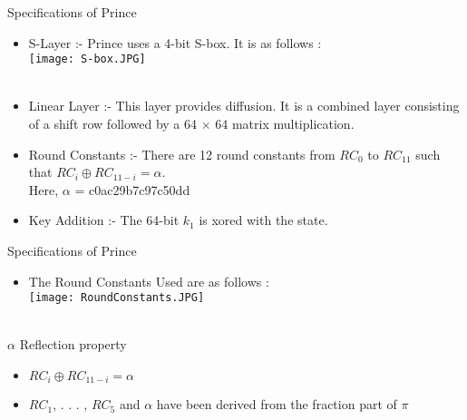 \begin{frame}{Specifications of Prince}
\begin{itemize}
    
    \item S-Layer :- Prince uses a 4-bit S-box. It is as follows : \\
     \texttt{[image: S-box.JPG]} \\ \\
     \item Linear Layer :- This layer provides diffusion. It is a combined layer consisting of a shift row followed by a 64 $\times$ 64 matrix multiplication.
     \item Round Constants :- There are 12 round constants from $RC_0$ to $RC_{11}$ such that $RC_i \oplus RC_{11-i} = \alpha$. \\
     Here, $\alpha$ = c0ac29b7c97c50dd \\
     \item Key Addition :- The 64-bit $k_1$ is xored with the state. 
\end{itemize}
\end{frame}

\begin{frame}{Specifications of Prince}
\begin{itemize}
    
   \item The Round Constants Used are as follows : \\
   \texttt{[image: RoundConstants.JPG]} \\ \\
\end{itemize}
\begin{block}{$\alpha$ Reflection property}
\begin{itemize}
    \item $RC_i \oplus RC_{11-i} = \alpha$ 
    \item $RC_1$, . . . , $RC_5$ and $\alpha$ have been derived from the fraction part of $\pi$
\end{itemize}
\end{block}
\end{frame}


